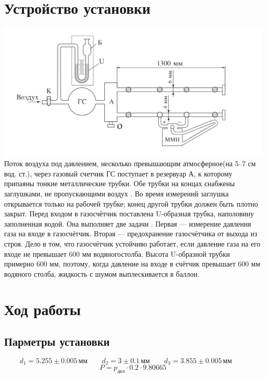 \documentclass[a4paper,12pt]{article}
\begin{document}
	\section{Устройство установки}
		\includegraphics[width = 0.9\linewidth]{instrument}
		Поток воздуха под давлением, несколько превышающим атмосферное(на 5–7 см вод. ст.), через газовый счетчик ГС поступает в резервуар А, к которому припаяны тонкие металлические трубки. Обе трубки на концах снабжены заглушками, не пропускающими воздух . Во время измерений	заглушка открывается только на рабочей трубке; конец другой трубки должен быть плотно закрыт.
		Перед входом в газосчётчик поставлена U-образная трубка, наполовину заполненная водой. Она выполняет две задачи . Первая --- измерение давления газа на входе в газосчётчик. Вторая --- предохранение газосчётчика от выхода из строя. Дело в том, что  газосчётчик	устойчиво  работает, если давление газа на его входе не превышает 600 мм водяногостолба. Высота  U-образной трубки примерно 600 мм, поэтому, когда давление на входе в счётчик превышает 600 мм  водяного столба, жидкость с шумом выплескивается в баллон.					
	\section{Ход работы}
		\subsection{Парметры установки}
			\[
			d_1 = 5.255 \pm 0.005 \, \text{мм} \qquad
			d_2 = 3 \pm 0.1\, \text{мм} \qquad
			d_3 = 3.855 \pm 0.005\, \text{мм} \qquad
			\]
			\[
			P = p_{\text{дел}}\cdot0.2\cdot9.80665
			\]
\end{document}

